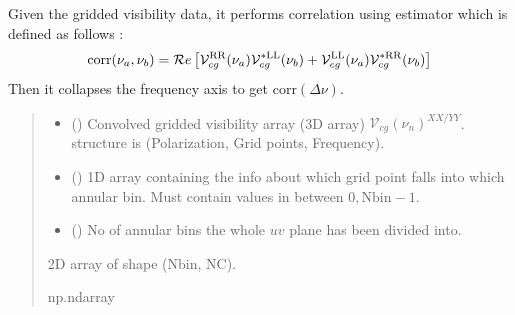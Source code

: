 \documentclass[a4paper,11pt,oneside,english,openany]{sphinxmanual}
\begin{document}
\begin{fulllineitems}
\label{\detokenize{correlate:correlate.correlate}}
\pysigstartsignatures
{}
\pysigstopsignatures
\sphinxAtStartPar
Given the gridded visibility data, it performs correlation using  estimator which is defined as follows :
\begin{equation*}
\begin{split}\text{corr}(\nu_a,\nu_b) = \mathcal{R}e\left[\mathcal{V}_{cg}^{\rm RR}(\nu_a) \mathcal{V}_{cg}^{*\rm LL}(\nu_b) + \mathcal{V}_{cg}^{\rm LL}(\nu_a) \mathcal{V}_{cg}^{*\rm RR}(\nu_b) \right]\end{split}
\end{equation*}
\sphinxAtStartPar
Then it collapses the frequency axis to get \(\text{corr}(\Delta\nu)\).
\begin{quote}\begin{description}
\begin{itemize}
\item {} 
\sphinxAtStartPar
{} () \textendash{} Convolved gridded visibility array (3D array) \(\mathcal{V}_{cg}(\nu_n)^{XX/YY}\).  structure is (Polarization, Grid points, Frequency).

\item {} 
\sphinxAtStartPar
{} () \textendash{} 1D array containing the info about which grid point falls into which annular bin. Must contain values in between \(0,\textrm{Nbin}-1\).

\item {} 
\sphinxAtStartPar
{} () \textendash{} No of annular bins the whole \(uv\) plane has been divided into.

\end{itemize}

\sphinxAtStartPar
{} \textendash{} 2D array of shape (Nbin, NC).

\sphinxAtStartPar
np.ndarray


\end{description}
\end{quote}
\end{fulllineitems}
\end{document}
